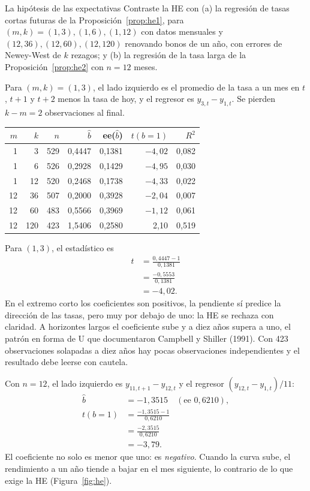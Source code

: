 \begin{ejresuelto}{La hipótesis de las expectativas}\label{ej:he}
\enunciado Contraste la HE con (a) la regresión de tasas cortas futuras de la Proposición~\ref{prop:he1}, para
$(m,k)=(1,3),(1,6),(1,12)$ con datos mensuales y $(12,36),(12,60),(12,120)$ renovando bonos de un año, con errores de
Newey-West de $k$ rezagos; y (b) la regresión de la tasa larga de la Proposición~\ref{prop:he2} con $n=12$ meses.

\solucion
{} Para $(m,k)=(1,3)$, el lado izquierdo es el promedio de la tasa a un mes en
$t$, $t+1$ y $t+2$ menos la tasa de hoy, y el regresor es $y_{3,t}-y_{1,t}$. Se pierden $k-m=2$ observaciones al final.
\begin{center}\small
\begin{tabular}{@{}rrrrrrr@{}}
\toprule
$m$ & $k$ & $n$ & $\hat b$ & ee($\hat b$) & $t(b=1)$ & $R^2$ \\
\midrule
1  & 3   & 529 & 0,4447 & 0,1381 & $-4{,}02$ & 0,082 \\
1  & 6   & 526 & 0,2928 & 0,1429 & $-4{,}95$ & 0,030 \\
1  & 12  & 520 & 0,2468 & 0,1738 & $-4{,}33$ & 0,022 \\
12 & 36  & 507 & 0,2000 & 0,3928 & $-2{,}04$ & 0,007 \\
12 & 60  & 483 & 0,5566 & 0,3969 & $-1{,}12$ & 0,061 \\
12 & 120 & 423 & 1,5406 & 0,2580 & 2,10 & 0,519 \\
\bottomrule
\end{tabular}
\end{center}
Para $(1,3)$, el estadístico es
\begin{align*}
  t &= \frac{0{,}4447-1}{0{,}1381}\\
    &= \frac{-0{,}5553}{0{,}1381}\\
    &= -4{,}02 .
\end{align*}
En el extremo corto los coeficientes son positivos, la pendiente sí predice la dirección de las tasas, pero muy por
debajo de uno: la HE se rechaza con claridad. A horizontes largos el coeficiente sube y a diez años supera a uno, el patrón
en forma de U que documentaron Campbell y Shiller (1991). Con 423 observaciones solapadas a diez años hay pocas
observaciones independientes y el resultado debe leerse con cautela.

 Con $n=12$, el lado izquierdo es $y_{11,t+1}-y_{12,t}$ y el regresor $(y_{12,t}-y_{1,t})/11$:
\begin{align*}
  \hat b &= -1{,}3515 \quad(\text{ee }0{,}6210),\\
  t(b=1) &= \frac{-1{,}3515-1}{0{,}6210}\\
         &= \frac{-2{,}3515}{0{,}6210}\\
         &= -3{,}79 .
\end{align*}
El coeficiente no solo es menor que uno: es \emph{negativo}. Cuando la curva sube, el rendimiento a un año tiende a bajar en
el mes siguiente, lo contrario de lo que exige la HE (Figura~\ref{fig:he}).


\end{ejresuelto}
